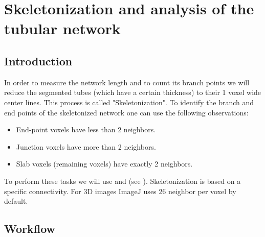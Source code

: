 \section{Skeletonization and analysis of the tubular network}

\subsection{Introduction}
In order to measure the network length and to count its branch points we will reduce the segmented tubes (which have a certain thickness) to their 1 voxel wide center lines. This process is called "Skeletonization". 
To identify the branch and end points of the skeletonized network one can use the following observations:

\begin{itemize}
\item End-point voxels have less than 2 neighbors.
\item Junction voxels have more than 2 neighbors.
\item Slab voxels (remaining voxels) have exactly 2 neighbors.
\end{itemize}
To perform these tasks we will use  and  (see \cite{Arganda-Carreras2010}). Skeletonization is based on a specific connectivity. For 3D images ImageJ uses 26 neighbor per voxel by default.

\subsection{Workflow}

